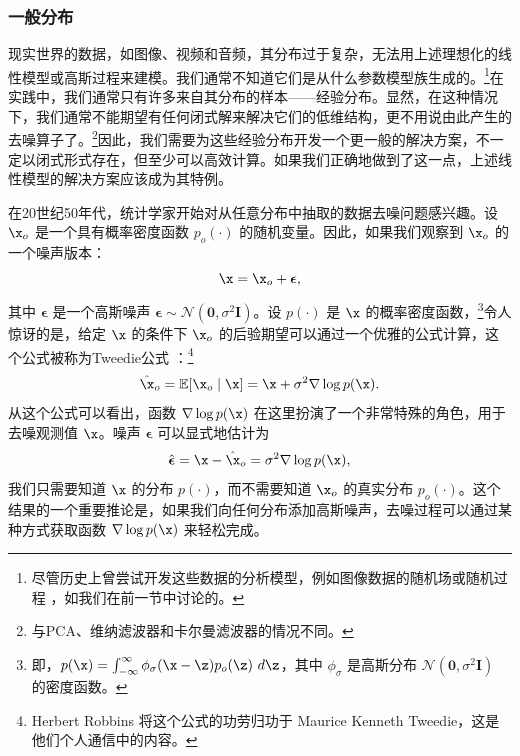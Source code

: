 \documentclass[../../book-main.tex]{subfiles}
\begin{document}
\subsubsection{一般分布}\label{sec:denoising-intro}

现实世界的数据，如图像、视频和音频，其分布过于复杂，无法用上述理想化的线性模型或高斯过程来建模。我们通常不知道它们是从什么参数模型族生成的。{\footnote{尽管历史上曾尝试开发这些数据的分析模型，例如图像数据的随机场或随机过程 \cite{Mumford-1999}，如我们在前一节中讨论的。}}在实践中，我们通常只有许多来自其分布的样本——经验分布。显然，在这种情况下，我们通常不能期望有任何闭式解来解决它们的低维结构，更不用说由此产生的去噪算子了。{\footnote{与PCA、维纳滤波器和卡尔曼滤波器的情况不同。}}因此，我们需要为这些经验分布开发一个更一般的解决方案，不一定以闭式形式存在，但至少可以高效计算。如果我们正确地做到了这一点，上述线性模型的解决方案应该成为其特例。

在20世纪50年代，统计学家开始对从任意分布中抽取的数据去噪问题感兴趣。设 $\x_o$ 是一个具有概率密度函数 $p_o(\cdot)$ 的随机变量。因此，如果我们观察到 $\x_o$ 的一个噪声版本：
\begin{equation}
    \x = \x_o + \boldsymbol{\epsilon}, 
\end{equation}
其中 $\boldsymbol{\epsilon}$ 是一个高斯噪声 $\boldsymbol{\epsilon} \sim \mathcal{N}(\boldsymbol{0}, \sigma^2 \boldsymbol{I})$。设 $p(\cdot)$ 是 $\x$ 的概率密度函数，\footnote{即，$p(\x) = \int_{-\infty}^{\infty} \phi_{\sigma}(\x - \z)p_o(\z)~d\z$，其中 $\phi_{\sigma}$ 是高斯分布 $\mathcal{N}(\boldsymbol{0}, \sigma^2 \boldsymbol{I})$ 的密度函数。}令人惊讶的是，给定 $\x$ 的条件下 $\x_o$ 的后验期望可以通过一个优雅的公式计算，这个公式被称为Tweedie公式 \cite{Robbins1956AnEB}：\footnote{Herbert Robbins 将这个公式的功劳归功于 Maurice Kenneth Tweedie，这是他们个人通信中的内容。}
\begin{equation}
    \hat \x_o = \mathbb{E}[\x_o\mid \x] = \x + \sigma^2 \nabla \log p(\x).
\end{equation}
从这个公式可以看出，函数 $\nabla \log p(\x)$ 在这里扮演了一个非常特殊的角色，用于去噪观测值 $\x$。噪声 $\boldsymbol{\epsilon}$ 可以显式地估计为
\begin{equation}
    \hat{\boldsymbol{\epsilon}} = \x - \hat \x_o = \sigma^2 \nabla \log p(\x),
\end{equation}
我们只需要知道 $\x$ 的分布 $p(\cdot)$，而不需要知道 $\x_o$ 的真实分布 $p_o(\cdot)$。这个结果的一个重要推论是，如果我们向任何分布添加高斯噪声，去噪过程可以通过某种方式获取函数 $\nabla \log p(\x)$ 来轻松完成。
\end{document}
